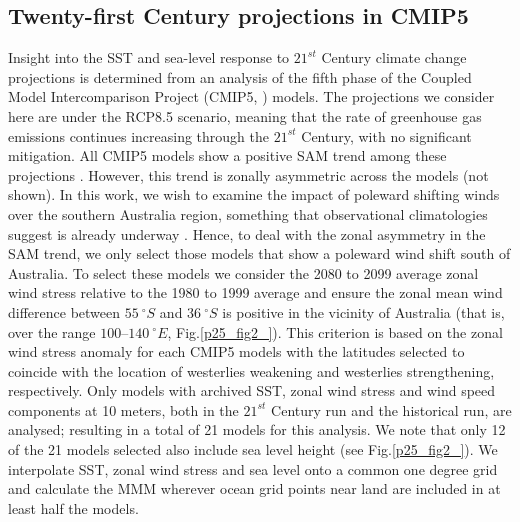 \documentclass[draft,linenumbers]{agujournal2018}
\begin{document}
\subsection{Twenty-first Century projections in CMIP5} \label{Twenty-first Century analysis in CMIP5}
Insight into the SST and sea-level response to $21^{st}$ Century climate change projections is determined from an analysis of the fifth phase of the Coupled Model Intercomparison Project (CMIP5, \citealp{Taylor2012}) models. The projections we consider here are under the RCP8.5 scenario, meaning that the rate of greenhouse gas emissions continues increasing through the $21^{st}$ Century, with no significant mitigation. All CMIP5 models show a positive SAM trend among these projections \citep{Bracegirdle2013}. However, this trend is zonally asymmetric across the models (not shown). In this work, we wish to examine the impact of poleward shifting winds over the southern Australia region, something that observational climatologies suggest is already underway \citep{Reichler2016}. Hence, to deal with the zonal asymmetry in the SAM trend, we only select those models that show a poleward wind shift south of Australia. To select these models we consider the 2080 to 2099 average zonal wind stress relative to the 1980 to 1999 average and ensure the zonal mean wind difference between $55\ ^{\circ}S$ and $36\ ^{\circ}S$ is positive in the vicinity of Australia (that is, over the range $100$--$140\ ^{\circ}E$, Fig.\ref{p25_fig2_}). This criterion is based on the zonal wind stress anomaly for each CMIP5 models with the latitudes selected to coincide with the location of westerlies weakening and westerlies strengthening, respectively. Only models with archived SST, zonal wind stress and wind speed components at 10 meters, both in the $21^{st}$ Century run and the historical run, are analysed; resulting in a total of 21 models for this analysis. We note that only 12 of the 21 models selected also include sea level height (see Fig.\ref{p25_fig2_}). We interpolate SST, zonal wind stress and sea level onto a common one degree grid and calculate the MMM wherever ocean grid points near land are included in at least half the models.
\end{document}
